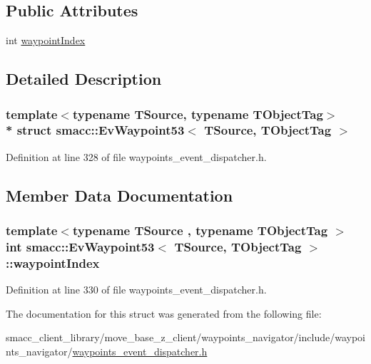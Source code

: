 \subsection*{Public Attributes}
\begin{DoxyCompactItemize}
\item 
int \hyperlink{structsmacc_1_1EvWaypoint53_a02f5dfb0d64b97666965f06a54628bbd}{waypoint\+Index}
\end{DoxyCompactItemize}


\subsection{Detailed Description}
\subsubsection*{template$<$typename T\+Source, typename T\+Object\+Tag$>$\\*
struct smacc\+::\+Ev\+Waypoint53$<$ T\+Source, T\+Object\+Tag $>$}



Definition at line 328 of file waypoints\+\_\+event\+\_\+dispatcher.\+h.



\subsection{Member Data Documentation}
\subsubsection[{\texorpdfstring{waypoint\+Index}{waypointIndex}}]{\setlength{\rightskip}{0pt plus 5cm}template$<$typename T\+Source , typename T\+Object\+Tag $>$ int {\bf smacc\+::\+Ev\+Waypoint53}$<$ T\+Source, T\+Object\+Tag $>$\+::waypoint\+Index}\hypertarget{structsmacc_1_1EvWaypoint53_a02f5dfb0d64b97666965f06a54628bbd}{}\label{structsmacc_1_1EvWaypoint53_a02f5dfb0d64b97666965f06a54628bbd}


Definition at line 330 of file waypoints\+\_\+event\+\_\+dispatcher.\+h.



The documentation for this struct was generated from the following file\+:\begin{DoxyCompactItemize}
\item 
smacc\+\_\+client\+\_\+library/move\+\_\+base\+\_\+z\+\_\+client/waypoints\+\_\+navigator/include/waypoints\+\_\+navigator/\hyperlink{waypoints__event__dispatcher_8h}{waypoints\+\_\+event\+\_\+dispatcher.\+h}\end{DoxyCompactItemize}
